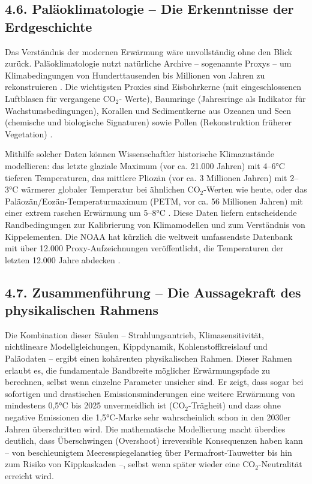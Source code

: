 \documentclass[12pt, a4paper]{article}
\begin{document}
	\subsection*{4.6. Paläoklimatologie – Die Erkenntnisse der Erdgeschichte}
	Das Verständnis der modernen Erwärmung wäre unvollständig ohne den Blick zurück.
	Paläoklimatologie nutzt natürliche Archive – sogenannte Proxys – um Klimabedingungen von
	Hunderttausenden bis Millionen von Jahren zu rekonstruieren \cite{noaapaleo2025}. Die
	wichtigsten Proxies sind Eisbohrkerne (mit eingeschlossenen Luftblasen für vergangene CO$_2$-
	Werte), Baumringe (Jahresringe als Indikator für Wachstumsbedingungen), Korallen und
	Sedimentkerne aus Ozeanen und Seen (chemische und biologische Signaturen) sowie Pollen
	(Rekonstruktion früherer Vegetation) \cite{noaa2020, noaapaleo2025}.
	
	Mithilfe solcher Daten können Wissenschaftler historische Klimazustände modellieren: das
	letzte glaziale Maximum (vor ca. 21.000 Jahren) mit 4–6°C tieferen Temperaturen, das
	mittlere Pliozän (vor ca. 3 Millionen Jahren) mit 2–3°C wärmerer globaler Temperatur bei
	ähnlichen CO$_2$-Werten wie heute, oder das Paläozän/Eozän-Temperaturmaximum (PETM, vor ca.
	56 Millionen Jahren) mit einer extrem raschen Erwärmung um 5–8°C \cite{noaa2020}. Diese
	Daten liefern entscheidende Randbedingungen zur Kalibrierung von Klimamodellen und zum
	Verständnis von Kippelementen. Die NOAA hat kürzlich die weltweit umfassendste Datenbank
	mit über 12.000 Proxy-Aufzeichnungen veröffentlicht, die Temperaturen der letzten 12.000
	Jahre abdecken \cite{noaa2020}.
	
	\subsection*{4.7. Zusammenführung – Die Aussagekraft des physikalischen Rahmens}
	Die Kombination dieser Säulen – Strahlungsantrieb, Klimasensitivität, nichtlineare
	Modellgleichungen, Kippdynamik, Kohlenstoffkreislauf und Paläodaten – ergibt einen kohärenten
	physikalischen Rahmen. Dieser Rahmen erlaubt es, die fundamentale Bandbreite möglicher
	Erwärmungspfade zu berechnen, selbst wenn einzelne Parameter unsicher sind. Er zeigt, dass
	sogar bei sofortigen und drastischen Emissionsminderungen eine weitere Erwärmung von
	mindestens 0,5°C bis 2025 unvermeidlich ist (CO$_2$-Trägheit) und dass ohne negative
	Emissionen die 1,5°C-Marke sehr wahrscheinlich schon in den 2030er Jahren überschritten wird.
	Die mathematische Modellierung macht überdies deutlich, dass Überschwingen (Overshoot)
	irreversible Konsequenzen haben kann – von beschleunigtem Meeresspiegelanstieg über
	Permafrost-Tauwetter bis hin zum Risiko von Kippkaskaden –, selbst wenn später wieder eine
	CO$_2$-Neutralität erreicht wird.
	
\end{document}
